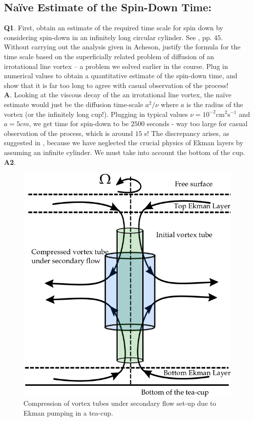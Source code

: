 \documentclass{article}
\begin{document}
\subsection{Na\"ive Estimate of the Spin-Down Time:}
\textbf{Q1}. First, obtain an estimate of the required time scale for spin down by considering spin-down in an infinitely long circular cylinder. See \cite{acheson1991elementary}, pp. $45$. Without carrying out the analysis given in Acheson, justify the formula for the time scale based on the superficially related problem of diffusion of an irrotational line vortex – a problem we solved earlier in the course. Plug in numerical values to obtain a quantitative estimate of the spin-down time, and show that it is far too long to agree with casual observation of the process!\\
%
\textbf{A}. Looking at the viscous decay of the an irrotational line vortex, the na\"ive estimate would just be the diffusion time-scale $a^{2}/\nu$ where $a$ is the radius of the vortex (or the infinitely long cup!). Plugging in typical values $\nu = 10^{-2} \textrm{cm}^{2}\textrm{s}^{-1}$ and $a = 5 cm$, we get time for spin-down to be $2500$ seconds - way too large for casual observation of the process, which is around $15$ s! The discrepancy arises, as suggested in \cite{acheson1991elementary}, because we have neglected the crucial physics of Ekman layers by assuming an infinite cylinder. We must take into account the bottom of the cup. \\ 
%
\textbf{A2}.
\begin{figure}[H]
    \centering
    \includegraphics[scale = 0.5]{Figs/tea_cup.png}
    \caption{Compression of vortex tubes under secondary flow set-up due to Ekman pumping in a tea-cup.}
    \label{fig:tea_cup}
\end{figure}
\end{document}
